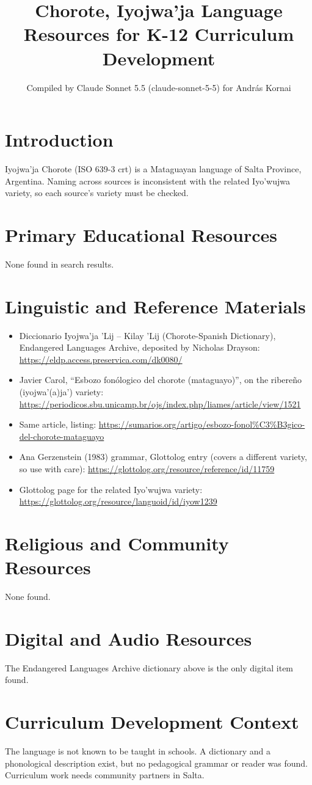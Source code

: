 \documentclass[12pt]{article}
\title{Chorote, Iyojwa'ja Language Resources for K-12 Curriculum Development}
\author{Compiled by Claude Sonnet 5.5 (claude-sonnet-5-5) for Andr\'as Kornai}
\date{}
\begin{document}
\maketitle
\section{Introduction}
Iyojwa'ja Chorote (ISO 639-3 crt) is a Mataguayan language of Salta Province, Argentina. Naming across sources is inconsistent with the related Iyo'wujwa variety, so each source's variety must be checked.
\section{Primary Educational Resources}
None found in search results.
\section{Linguistic and Reference Materials}
\begin{itemize}
\item Diccionario Iyojwa'ja 'Lij -- Kilay 'Lij (Chorote-Spanish Dictionary), Endangered Languages Archive, deposited by Nicholas Drayson: \url{https://eldp.access.preservica.com/dk0080/}
\item Javier Carol, ``Esbozo fon\'ologico del chorote (mataguayo)'', on the ribere\~no (iyojwa'(a)ja') variety: \url{https://periodicos.sbu.unicamp.br/ojs/index.php/liames/article/view/1521}
\item Same article, listing: \url{https://sumarios.org/artigo/esbozo-fonol%C3%B3gico-del-chorote-mataguayo}
\item Ana Gerzenstein (1983) grammar, Glottolog entry (covers a different variety, so use with care): \url{https://glottolog.org/resource/reference/id/11759}
\item Glottolog page for the related Iyo'wujwa variety: \url{https://glottolog.org/resource/languoid/id/iyow1239}
\end{itemize}
\section{Religious and Community Resources}
None found.
\section{Digital and Audio Resources}
The Endangered Languages Archive dictionary above is the only digital item found.
\section{Curriculum Development Context}
The language is not known to be taught in schools. A dictionary and a phonological description exist, but no pedagogical grammar or reader was found. Curriculum work needs community partners in Salta.
\end{document}
